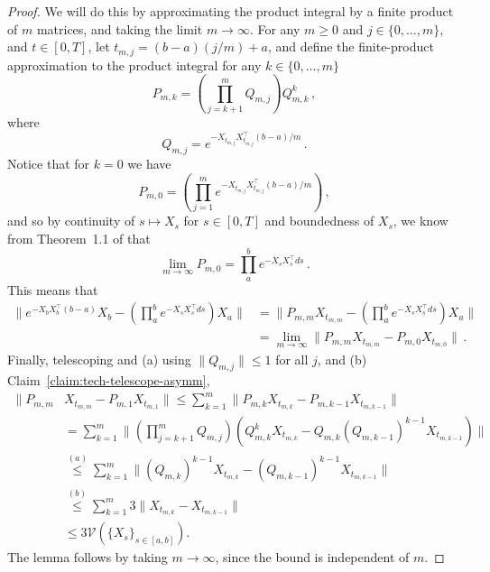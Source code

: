 \documentclass[11pt]{article} %
\newcommand{\<}{\langle}
\renewcommand{\>}{\rangle}
\def\cV{{\mathcal V}}
\def\cV{{\mathcal V}}
\def\cV{{\mathcal V}}
\theoremstyle{plain}
\theoremstyle{definition}
\theoremstyle{remark}
\begin{document}
\claimtechnicalcenter*
\begin{proof}

We will do this by approximating the product integral by a finite product of $m$ matrices, and taking the limit $m \to \infty$. For any $m \geq 0$ and $j \in \{0,\ldots,m\}$, and $t \in [0,T]$, let $t_{m,j} = (b-a)(j/m) + a$, and define the finite-product approximation to the product integral for any $k \in \{0,\ldots,m\}$
$$P_{m,k} = \left(\prod_{j=k+1}^m Q_{m,j}\right) Q_{m,k}^k\,,$$
where $$Q_{m,j} = e^{-X_{t_{m,j}} X_{t_{m,j}}^{\top} (b-a)/m}\,.$$
Notice that for $k = 0$ we have $$P_{m,0} = \left(\prod_{j=1}^m e^{-X_{t_{m,j}} X_{t_{m,j}}^{\top} (b-a)/m}\right)\,,$$ and so by continuity of $s \mapsto  X_{s}$ for $s \in [0,T]$ and boundedness of $X_{s}$, we know from Theorem~1.1 of \cite{dollard_friedman_1984} that
$$\lim_{m \to \infty} P_{m,0} = \prod_{a}^b e^{-X_s X_s^{\top} ds}\,.$$
This means that 
\begin{align*}
\|e^{-X_bX_b^{\top} (b-a)} X_b - \left(\prod_{a}^b e^{-X_s X_s^{\top} ds}\right) X_a\| &= \|P_{m,m} X_{t_{m,m}} - \left(\prod_{a}^b e^{-X_s X_s^{\top} ds}\right) X_a\| \\
&= \lim_{m \to \infty} \|P_{m,m} X_{t_{m,m}} - P_{m,0} X_{t_{m,0}}\|\,.
\end{align*}
Finally, telescoping and (a) using $\|Q_{m,j}\| \leq 1$ for all $j$, and (b) Claim~\ref{claim:tech-telescope-asymm},
\begin{align*}
\|P_{m,m}& X_{t_{m,m}} - P_{m,1} X_{t_{m,1}}\| \leq \sum_{k=1}^m \|P_{m,k} X_{t_{m,k}} - P_{m,k-1} X_{t_{m,k-1}}\| \\
&= \sum_{k=1}^m \|\left(\prod_{j=k+1}^m Q_{m,j} \right) (Q_{m,k}^k X_{t_{m,k}}  - Q_{m,k} (Q_{m,{k-1}})^{k-1} X_{t_{m,k-1}})\| \\
&\stackrel{(a)}{\leq} \sum_{k=1}^m \|(Q_{m,k})^{k-1} X_{t_{m,k}}  - (Q_{m,{k-1}})^{k-1} X_{t_{m,k-1}}\| \\
&\stackrel{(b)}{\leq} \sum_{k=1}^m 3\|X_{t_{m,k}} - X_{t_{m,k-1}}\| \\
&\leq 3 \cV(\{X_s\}_{s \in [a,b]}).
\end{align*}
The lemma follows by taking $m \to \infty$, since the bound is independent of $m$.
\end{proof}
\end{document}
